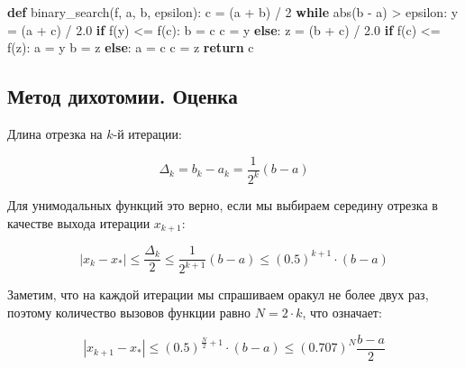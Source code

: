 \documentclass[
  russian,
  letterpaper,
  DIV=11,
  numbers=noendperiod]{scrartcl}
\newenvironment{Shaded}{\begin{snugshade}}{\end{snugshade}}
\newcommand{\BuiltInTok}[1]{\textcolor[rgb]{0.00,0.23,0.31}{#1}}
\newcommand{\ControlFlowTok}[1]{\textcolor[rgb]{0.00,0.23,0.31}{\textbf{#1}}}
\newcommand{\DecValTok}[1]{\textcolor[rgb]{0.68,0.00,0.00}{#1}}
\newcommand{\FloatTok}[1]{\textcolor[rgb]{0.68,0.00,0.00}{#1}}
\newcommand{\KeywordTok}[1]{\textcolor[rgb]{0.00,0.23,0.31}{\textbf{#1}}}
\newcommand{\NormalTok}[1]{\textcolor[rgb]{0.00,0.23,0.31}{#1}}
\newcommand{\OperatorTok}[1]{\textcolor[rgb]{0.37,0.37,0.37}{#1}}
\begin{document}
\begin{Shaded}
\begin{Highlighting}[]
\KeywordTok{def}\NormalTok{ binary\_search(f, a, b, epsilon):}
\NormalTok{   c }\OperatorTok{=}\NormalTok{ (a }\OperatorTok{+}\NormalTok{ b) }\OperatorTok{/} \DecValTok{2}
      \ControlFlowTok{while} \BuiltInTok{abs}\NormalTok{(b }\OperatorTok{{-}}\NormalTok{ a) }\OperatorTok{\textgreater{}}\NormalTok{ epsilon:}
\NormalTok{         y }\OperatorTok{=}\NormalTok{ (a }\OperatorTok{+}\NormalTok{ c) }\OperatorTok{/} \FloatTok{2.0}
         \ControlFlowTok{if}\NormalTok{ f(y) }\OperatorTok{\textless{}=}\NormalTok{ f(c):}
\NormalTok{            b }\OperatorTok{=}\NormalTok{ c}
\NormalTok{            c }\OperatorTok{=}\NormalTok{ y}
         \ControlFlowTok{else}\NormalTok{:}
\NormalTok{            z }\OperatorTok{=}\NormalTok{ (b }\OperatorTok{+}\NormalTok{ c) }\OperatorTok{/} \FloatTok{2.0}
         \ControlFlowTok{if}\NormalTok{ f(c) }\OperatorTok{\textless{}=}\NormalTok{ f(z):}
\NormalTok{            a }\OperatorTok{=}\NormalTok{ y}
\NormalTok{            b }\OperatorTok{=}\NormalTok{ z}
         \ControlFlowTok{else}\NormalTok{:}
\NormalTok{            a }\OperatorTok{=}\NormalTok{ c}
\NormalTok{            c }\OperatorTok{=}\NormalTok{ z}
      \ControlFlowTok{return}\NormalTok{ c}
\end{Highlighting}
\end{Shaded}

\subsection{Метод дихотомии.
Оценка}\label{ux43cux435ux442ux43eux434-ux434ux438ux445ux43eux442ux43eux43cux438ux438.-ux43eux446ux435ux43dux43aux430}

Длина отрезка на \(k\)-й итерации:

\[
\Delta_{k} = b_{k} - a_{k} = \dfrac{1}{2^k}(b-a)
\]

Для унимодальных функций это верно, если мы выбираем середину отрезка в
качестве выхода итерации \(x_{k+1}\):

\[
|x_{k} - x_*| \leq \dfrac{\Delta_{k}}{2} \leq \dfrac{1}{2^{k+1}}(b-a) \leq (0.5)^{k+1} \cdot (b-a)
\]

Заметим, что на каждой итерации мы спрашиваем оракул не более двух раз,
поэтому количество вызовов функции равно \(N = 2 \cdot k\), что
означает:

\[
|x_{k+1} - x_*| \leq (0.5)^{\frac{N}{2}+1} \cdot (b-a) \leq  (0.707)^{N}  \frac{b-a}{2}
\]
\end{document}
